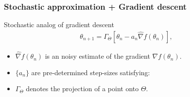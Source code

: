 \begin{frame}
\begin{small}
\frametitle{\centering  Stochastic approximation + Gradient descent}
\begin{block}{\alert {Stochastic analog of gradient descent}}
\begin{align}\label{saalg}
\theta_{n+1} = \Gamma_{\Theta} \left [\theta_{n} - a_{n} \widehat{\nabla} f(\theta_{n}) \right],
\end{align}

\begin{itemize}
\item $ \widehat{\nabla} f(\theta_{n})$ is an \alert{noisy} estimate of the gradient $ {\nabla} f(\theta_{n})$.
\item $\{a_{n}\}$ are  \alert{pre-determined} step-sizes satisfying:
\item $\Gamma_{\Theta}$ denotes the projection of a point  onto $\Theta$.
\end{itemize}
\end{block}
\end{small}
\end{frame}


